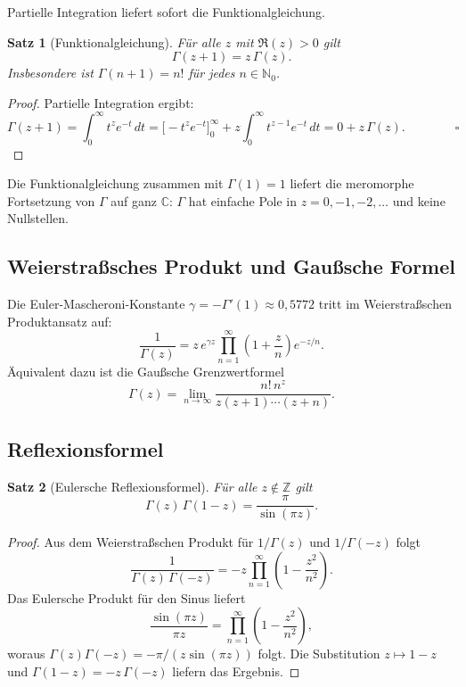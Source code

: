 \documentclass[12pt,a4paper]{amsart}
\newtheorem{theorem}{Satz}[section]
\theoremstyle{definition}
\begin{document}
Partielle Integration liefert sofort die Funktionalgleichung.

\begin{theorem}[Funktionalgleichung]\label{thm:gamma_functional_de}
Für alle \(z\) mit \(\Re(z) > 0\) gilt
\[
  \Gamma(z+1) = z\,\Gamma(z).
\]
Insbesondere ist \(\Gamma(n+1) = n!\) für jedes \(n \in \mathbb{N}_0\).
\end{theorem}

\begin{proof}
Partielle Integration ergibt:
\[
  \Gamma(z+1)
  = \int_0^\infty t^z e^{-t}\,dt
  = \bigl[-t^z e^{-t}\bigr]_0^\infty + z\int_0^\infty t^{z-1}e^{-t}\,dt
  = 0 + z\,\Gamma(z). \qquad\qquad\square
\]
\end{proof}

Die Funktionalgleichung zusammen mit \(\Gamma(1) = 1\) liefert die meromorphe
Fortsetzung von \(\Gamma\) auf ganz \(\mathbb{C}\): \(\Gamma\) hat einfache Pole in
\(z = 0, -1, -2, \ldots\) und keine Nullstellen.

\subsection{Weierstraßsches Produkt und Gaußsche Formel}

Die Euler-Mascheroni-Konstante \(\gamma = -\Gamma'(1) \approx 0{,}5772\) tritt im
Weierstraßschen Produktansatz auf:
\[
  \frac{1}{\Gamma(z)}
  = z\,e^{\gamma z}\prod_{n=1}^\infty \left(1+\frac{z}{n}\right)e^{-z/n}.
\]
Äquivalent dazu ist die Gaußsche Grenzwertformel
\[
  \Gamma(z) = \lim_{n\to\infty} \frac{n!\,n^z}{z(z+1)\cdots(z+n)}.
\]

\subsection{Reflexionsformel}

\begin{theorem}[Eulersche Reflexionsformel]\label{thm:gamma_reflection_de}
Für alle \(z \notin \mathbb{Z}\) gilt
\[
  \Gamma(z)\,\Gamma(1-z) = \frac{\pi}{\sin(\pi z)}.
\]
\end{theorem}

\begin{proof}
Aus dem Weierstraßschen Produkt für \(1/\Gamma(z)\) und \(1/\Gamma(-z)\) folgt
\[
  \frac{1}{\Gamma(z)\,\Gamma(-z)}
  = -z\prod_{n=1}^\infty\left(1-\frac{z^2}{n^2}\right).
\]
Das Eulersche Produkt für den Sinus liefert
\[
  \frac{\sin(\pi z)}{\pi z} = \prod_{n=1}^\infty\left(1-\frac{z^2}{n^2}\right),
\]
woraus \(\Gamma(z)\Gamma(-z) = -\pi/(z\sin(\pi z))\) folgt.
Die Substitution \(z\mapsto 1-z\) und \(\Gamma(1-z) = -z\,\Gamma(-z)\) liefern
das Ergebnis.
\end{proof}
\end{document}
